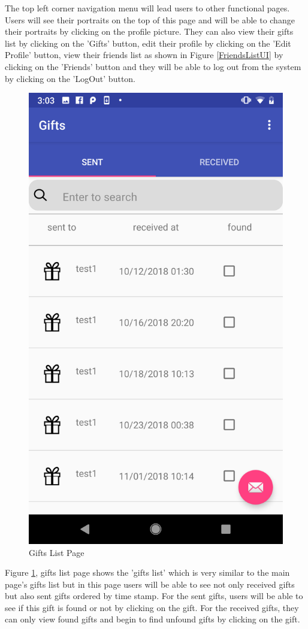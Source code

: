 \par The top left corner navigation menu will lead users to other functional pages. Users will see their portraits on the top of this page and will be able to change their portraits by clicking on the profile picture. They can also view their gifts list by clicking on the 'Gifts' button, edit their profile by clicking on the 'Edit Profile' button, view their friends list as shown in Figure \ref{FriendsListUI} by clicking on the 'Friends' button and they will be able to log out from the system by clicking on the 'LogOut' button. 

\begin{figure}[htb]
\centering
\includegraphics[width=.4\textwidth]{section03/assets/GiftsList.png}
\caption[Gifts List Page]{\label{GiftsListUI}Gifts List Page}
\end{figure}
\par Figure \ref{GiftsListUI}, gifts list page shows the 'gifts list' which is very similar to the main page's gifts list but in this page users will be able to see not only received gifts but also sent gifts ordered by time stamp. For the sent gifts, users will be able to see if this gift is found or not by clicking on the gift. For the received gifts, they can only view found gifts and begin to find unfound gifts by clicking on the gift. 


